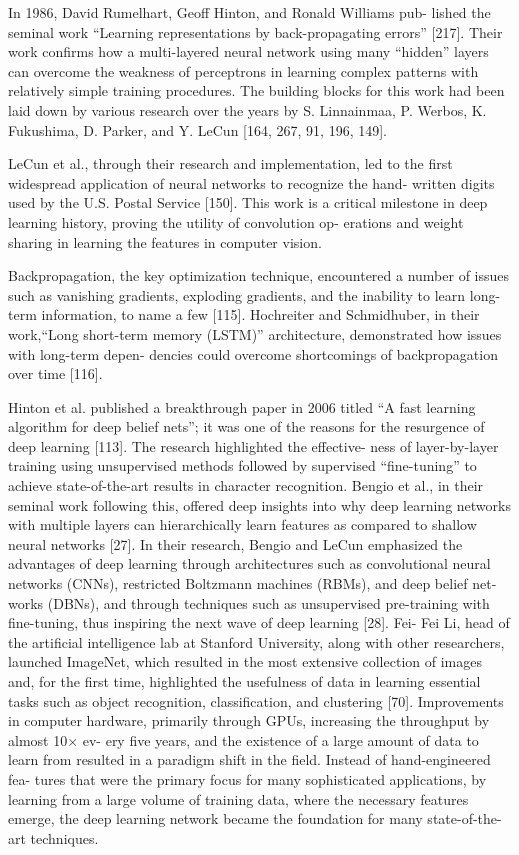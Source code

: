 In 1986, David Rumelhart, Geoff Hinton, and Ronald Williams pub-
lished the seminal work “Learning representations by back-propagating
errors” [217]. Their work confirms how a multi-layered neural network
using many “hidden” layers can overcome the weakness of perceptrons
in learning complex patterns with relatively simple training procedures.
The building blocks for this work had been laid down by various research
over the years by S. Linnainmaa, P. Werbos, K. Fukushima, D. Parker,
and Y. LeCun [164, 267, 91, 196, 149].

LeCun et al., through their research and implementation, led to the
first widespread application of neural networks to recognize the hand-
written digits used by the U.S. Postal Service [150]. This work is a critical
milestone in deep learning history, proving the utility of convolution op-
erations and weight sharing in learning the features in computer vision.

Backpropagation, the key optimization technique, encountered a
number of issues such as vanishing gradients, exploding gradients, and
the inability to learn long-term information, to name a few [115].
Hochreiter and Schmidhuber, in their work,“Long short-term memory
(LSTM)” architecture, demonstrated how issues with long-term depen-
dencies could overcome shortcomings of backpropagation over time [116].

Hinton et al. published a breakthrough paper in 2006 titled “A fast
learning algorithm for deep belief nets”; it was one of the reasons for the
resurgence of deep learning [113]. The research highlighted the effective-
ness of layer-by-layer training using unsupervised methods followed by
supervised “fine-tuning” to achieve state-of-the-art results in character
recognition. Bengio et al., in their seminal work following this, offered deep insights into why deep learning networks with multiple layers can
hierarchically learn features as compared to shallow neural networks [27].
In their research, Bengio and LeCun emphasized the advantages of deep
learning through architectures such as convolutional neural networks
(CNNs), restricted Boltzmann machines (RBMs), and deep belief net-
works (DBNs), and through techniques such as unsupervised pre-training
with fine-tuning, thus inspiring the next wave of deep learning [28]. Fei-
Fei Li, head of the artificial intelligence lab at Stanford University, along
with other researchers, launched ImageNet, which resulted in the most
extensive collection of images and, for the first time, highlighted the
usefulness of data in learning essential tasks such as object recognition,
classification, and clustering [70]. Improvements in computer hardware,
primarily through GPUs, increasing the throughput by almost 10× ev-
ery five years, and the existence of a large amount of data to learn from
resulted in a paradigm shift in the field. Instead of hand-engineered fea-
tures that were the primary focus for many sophisticated applications,
by learning from a large volume of training data, where the necessary
features emerge, the deep learning network became the foundation for
many state-of-the-art techniques.

